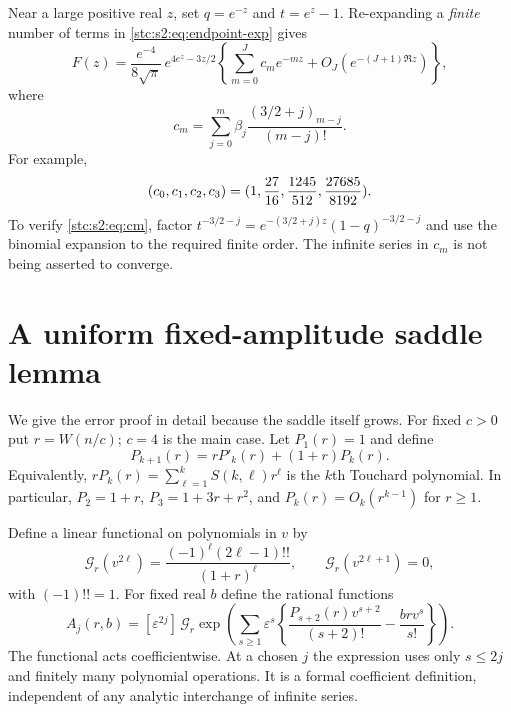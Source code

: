 \documentclass[11pt,letterpaper]{article}
\numberwithin{equation}{section}
\theoremstyle{remark}\newtheorem{remark}[theorem]{Remark}
\newcommand{\eps}{\varepsilon}
\newcommand{\G}{\mathcal G}
\begin{document}
Near a large positive real $z$, set $q=e^{-z}$ and $t=e^z-1$. Re-expanding a \emph{finite} number of terms in \eqref{stc:s2:eq:endpoint-exp} gives
\begin{equation}\label{stc:s2:eq:localF}
 F(z)=\frac{e^{-4}}{8\sqrt\pi}\,e^{4e^z-3z/2}
 \left\{\sum_{m=0}^Jc_me^{-mz}+O_J(e^{-(J+1)\Re z})\right\},
\end{equation}
where
\begin{equation}\label{stc:s2:eq:cm}
 c_m=\sum_{j=0}^m\beta_j\frac{(3/2+j)_{m-j}}{(m-j)!}.
\end{equation}
For example,
\begin{equation}\label{stc:s2:eq:cvalues}
 (c_0,c_1,c_2,c_3)=(1,\frac{27}{16},\frac{1245}{512},\frac{27685}{8192}).
\end{equation}
To verify \eqref{stc:s2:eq:cm}, factor $t^{-3/2-j}=e^{-(3/2+j)z}(1-q)^{-3/2-j}$ and use the binomial expansion to the required finite order. The infinite series in $c_m$ is not being asserted to converge.

\section{A uniform fixed-amplitude saddle lemma}\label{stc:s2:sec:saddle}
We give the error proof in detail because the saddle itself grows. For fixed $c>0$ put $r=W(n/c)$; $c=4$ is the main case. Let $P_1(r)=1$ and define
\begin{equation}\label{stc:s2:eq:touchard}
 P_{k+1}(r)=rP'_k(r)+(1+r)P_k(r).
\end{equation}
Equivalently, $rP_k(r)=\sum_{\ell=1}^kS(k,\ell)r^\ell$ is the $k$th Touchard polynomial. In particular, $P_2=1+r$, $P_3=1+3r+r^2$, and $P_k(r)=O_k(r^{k-1})$ for $r\ge1$.

Define a linear functional on polynomials in $v$ by
\begin{equation}\label{stc:s2:eq:gaussian}
 \G_r(v^{2\ell})=\frac{(-1)^\ell(2\ell-1)!!}{(1+r)^\ell},
 \qquad \G_r(v^{2\ell+1})=0,
\end{equation}
with $(-1)!!=1$. For fixed real $b$ define the rational functions
\begin{equation}\label{stc:s2:eq:Aj}
 A_j(r,b)=[\eps^{2j}]\,\G_r\exp\!\left(
 \sum_{s\ge1}\eps^s
 \left\{\frac{P_{s+2}(r)v^{s+2}}{(s+2)!}-\frac{brv^s}{s!}\right\}\right).
\end{equation}
The functional acts coefficientwise. At a chosen $j$ the expression uses only $s\le2j$ and finitely many polynomial operations. It is a formal coefficient definition, independent of any analytic interchange of infinite series.
\end{document}
